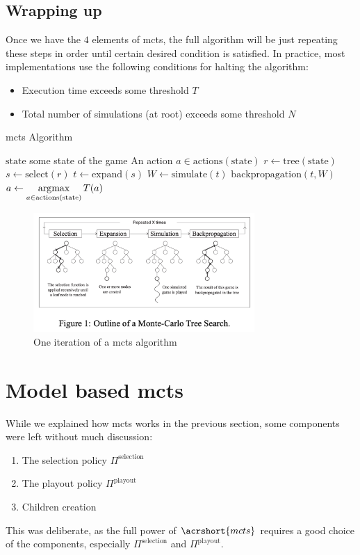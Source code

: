 \subsection{Wrapping up}
Once we have the $4$ elements of \acrshort{mcts}, the full algorithm will be just repeating these steps in order until certain desired condition is satisfied. In practice, most implementations use the following conditions for halting the  algorithm:
\begin{itemize}
	\item Execution time exceeds some threshold $T$
	\item Total number of simulations (at root) exceeds some threshold $N$
\end{itemize}

\begin{algorithm}
	\caption{\acrshort{mcts} Algorithm}\label{alg:MCTS}
	\begin{algorithmic}
		\Require $\text{state}$ some state of the game
		\Ensure An action $a\in \text{actions}(\text{state})$
		\State $r\leftarrow \text{tree}(\text{state})$
		\State $s\leftarrow \text{select}(r)$
		\State $t\leftarrow \text{expand}(s)$
		\State $W\leftarrow \text{simulate}(t)$
		\State $\text{backpropagation}(t,W)$
		\EndWhile
		\State \Return $a\leftarrow \displaystyle \operatorname*{\arg\!\max}_{a\in \text{actions}(\text{state})}T(a)$ 
	\end{algorithmic}
\end{algorithm}
\begin{figure}
	\centering
	\includegraphics[width=0.75\textwidth]{Figures/MCTS.png}
	\caption{One iteration of a \acrshort{mcts} algorithm}
\end{figure}

\section{Model based \acrshort{mcts}}
\label{section:RL:ModelBasedMCTS}
While we explained how \acrshort{mcts} works in the previous section, some components were left without much discussion:
\begin{enumerate}
	\item The selection policy $\Pi^{\text{selection}}$
	\item The playout policy $\Pi^{\text{playout}}$
	\item Children creation
\end{enumerate}
This was deliberate, as the full power of $\acrshort{mcts}$ requires a good choice of the components, especially $\Pi^{\text{selection}}$ and $\Pi^{\text{playout}}.$

